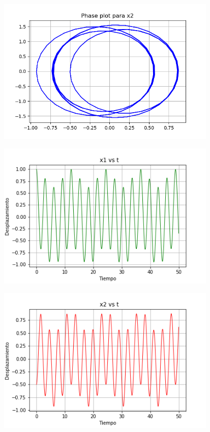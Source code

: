 \documentclass{article}
\begin{document}
\begin{center}
\includegraphics[height=7cm]{nolineal3_1_2.png}
\end{center}

\begin{center}
\includegraphics[height=7cm]{nolineal3_1_3.png}
\end{center}

\begin{center}
\includegraphics[height=7cm]{nolineal3_1_4.png}
\end{center}
\end{document}
